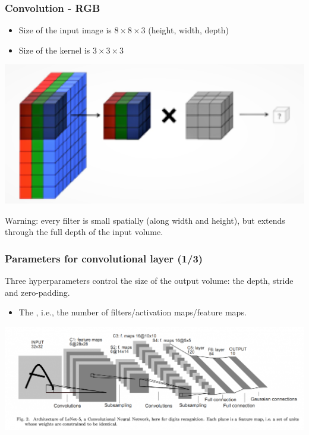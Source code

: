 \begin{frame}
	\frametitle{Convolution - RGB}

\begin{itemize}
	\item Size of the input image is $8 \times 8 \times 3$ (height, width, depth)
	\item Size of the kernel is $3 \times 3 \times 3$
\end{itemize}

	\begin{center}
		\includegraphics[scale=0.9]{figs/kernel_volume.png}
	\end{center}

Warning: every filter is small spatially (along width and height), but extends through the full depth of the input volume.


\end{frame}



\begin{frame}
	\frametitle{Parameters for convolutional layer (1/3)}

	Three hyperparameters control the size of the output volume: the depth, stride and zero-padding.

	\begin{itemize}
		\item The , i.e., the number of filters/activation maps/feature maps.
	\end{itemize}




		\begin{center}
			\includegraphics[scale=0.3]{figs/LeNet}
		\end{center}


\end{frame}

